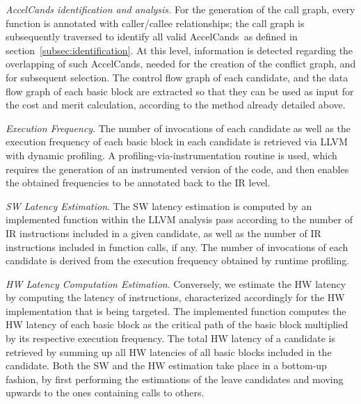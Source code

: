 \documentclass[]{usiinfthesis}
\newcommand{\candidates}{{AccelCand}s}
\begin{document}
\emph{AccelCands identification and analysis.} For the generation of
the call graph, every function is annotated with caller/callee relationships; 
the call graph is subsequently traversed to identify all valid \candidates\ as 
defined in section~\ref{subsec:identification}. At this level, information is 
detected regarding the overlapping of such \candidates, needed for the creation 
of the conflict graph, and for subsequent selection. The control flow graph of 
each candidate, and the data flow graph of each basic block are extracted so 
that they can be used as input for the cost and merit calculation, according to 
the method already detailed above.\par

\emph{Execution Frequency}.  The number of invocations of each
candidate as well as the execution frequency of each basic block in
each candidate is retrieved via LLVM with dynamic profiling. A
profiling-via-instrumentation routine is used, which requires the generation
of an instrumented version of the code, and then enables the obtained
frequencies to be annotated back to the IR level.\par

\emph{SW Latency Estimation}. The SW latency estimation is 
computed by an implemented function within the LLVM analysis pass
according to the number of IR instructions included in a given candidate,
as well as the number of IR instructions included in function calls, if
any.
The number of invocations of each candidate is derived from the execution 
frequency obtained by runtime profiling.
\par

\emph{HW Latency Computation Estimation}. 
Conversely, we estimate the HW latency 
by computing the latency of
instructions, characterized accordingly for the HW implementation
that is being targeted. 
The implemented function computes the HW
latency of each basic block as the critical path of the basic block
multiplied by its respective execution frequency. The total HW latency
of a candidate is retrieved by summing up all HW latencies of all basic 
blocks included in the candidate. 
Both the SW and the HW estimation take place in a bottom-up fashion,
by first performing the estimations of the leave candidates and moving
upwards to the ones containing calls to others.\par
\end{document}
